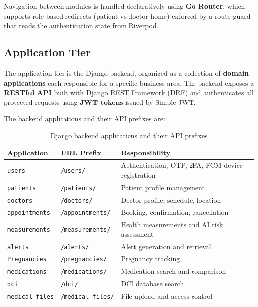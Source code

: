Navigation between modules is handled declaratively using \textbf{Go Router}, which supports role-based redirects (patient vs doctor home) enforced by a route guard that reads the authentication state from Riverpod.

\subsection{Application Tier}

The application tier is the Django backend, organized as a collection of \textbf{domain applications} each responsible for a specific business area. The backend exposes a \textbf{RESTful API} built with Django REST Framework (DRF) and authenticates all protected requests using \textbf{JWT tokens} issued by Simple JWT.

The backend applications and their API prefixes are:

\begin{table}[H]
\centering
\caption{Django backend applications and their API prefixes}
\renewcommand{\arraystretch}{1.3}
\begin{tabular}{|p{4.5cm}|p{4cm}|p{5cm}|}
\hline
\textbf{Application} & \textbf{URL Prefix} & \textbf{Responsibility} \\
\hline
\texttt{users} & \texttt{/users/} & Authentication, OTP, 2FA, FCM device registration \\
\hline
\texttt{patients} & \texttt{/patients/} & Patient profile management \\
\hline
\texttt{doctors} & \texttt{/doctors/} & Doctor profile, schedule, location \\
\hline
\texttt{appointments} & \texttt{/appointments/} & Booking, confirmation, cancellation \\
\hline
\texttt{measurements} & \texttt{/measurements/} & Health measurements and AI risk assessment \\
\hline
\texttt{alerts} & \texttt{/alerts/} & Alert generation and retrieval \\
\hline
\texttt{Pregnancies} & \texttt{/pregnancies/} & Pregnancy tracking \\
\hline
\texttt{medications} & \texttt{/medications/} & Medication search and comparison \\
\hline
\texttt{dci} & \texttt{/dci/} & DCI database search \\
\hline
\texttt{medical\_files} & \texttt{/medical\_files/} & File upload and access control \\
\hline
\end{tabular}
\end{table}

